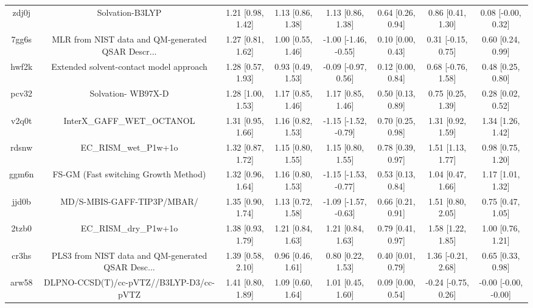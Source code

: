 \documentclass{article}
\begin{document}
\begin{center}
\begin{longtable}{|cccccccc|}
 zdj0j &                                    Solvation-B3LYP &  1.21 [0.98, 1.42] &  1.13 [0.86, 1.38] &     1.13 [0.86, 1.38] &  0.64 [0.26, 0.94] &    0.86 [0.41, 1.30] &    0.08 [-0.00, 0.32] \\
 7gg6s &  MLR from NIST data and QM-generated QSAR Descr... &  1.27 [0.81, 1.62] &  1.00 [0.55, 1.46] &  -1.00 [-1.46, -0.55] &  0.10 [0.00, 0.43] &   0.31 [-0.15, 0.75] &     0.60 [0.24, 0.99] \\
 hwf2k &            Extended solvent-contact model approach &  1.28 [0.57, 1.93] &  0.93 [0.49, 1.53] &   -0.09 [-0.97, 0.56] &  0.12 [0.00, 0.84] &   0.68 [-0.76, 1.58] &     0.48 [0.25, 0.80] \\
 pcv32 &                                 Solvation- WB97X-D &  1.28 [1.00, 1.53] &  1.17 [0.85, 1.46] &     1.17 [0.85, 1.46] &  0.50 [0.13, 0.89] &    0.75 [0.25, 1.39] &     0.28 [0.02, 0.52] \\
 v2q0t &                         InterX\_GAFF\_WET\_OCTANOL &  1.31 [0.95, 1.66] &  1.16 [0.82, 1.53] &  -1.15 [-1.52, -0.79] &  0.70 [0.25, 0.98] &    1.31 [0.92, 1.59] &     1.34 [1.26, 1.42] \\
 rdsnw &                              EC\_RISM\_wet\_P1w+1o &  1.32 [0.87, 1.72] &  1.15 [0.80, 1.55] &     1.15 [0.80, 1.55] &  0.78 [0.39, 0.97] &    1.51 [1.13, 1.77] &     0.98 [0.75, 1.20] \\
 ggm6n &               FS-GM (Fast switching Growth Method) &  1.32 [0.96, 1.64] &  1.16 [0.80, 1.53] &  -1.15 [-1.53, -0.77] &  0.53 [0.13, 0.84] &    1.04 [0.47, 1.66] &     1.17 [1.01, 1.32] \\
 jjd0b &                         MD/S-MBIS-GAFF-TIP3P/MBAR/ &  1.35 [0.90, 1.74] &  1.13 [0.72, 1.58] &  -1.09 [-1.57, -0.63] &  0.66 [0.21, 0.91] &    1.51 [0.80, 2.05] &     0.75 [0.47, 1.05] \\
 2tzb0 &                              EC\_RISM\_dry\_P1w+1o &  1.38 [0.93, 1.79] &  1.21 [0.84, 1.63] &     1.21 [0.84, 1.63] &  0.79 [0.41, 0.97] &    1.58 [1.22, 1.85] &     1.00 [0.76, 1.21] \\
 cr3hs &  PLS3 from NIST data and QM-generated QSAR Desc... &  1.39 [0.58, 2.10] &  0.96 [0.46, 1.61] &     0.80 [0.22, 1.53] &  0.40 [0.01, 0.79] &   1.36 [-0.21, 2.68] &     0.65 [0.33, 0.98] \\
 arw58 &            DLPNO-CCSD(T)/cc-pVTZ//B3LYP-D3/cc-pVTZ &  1.41 [0.80, 1.89] &  1.09 [0.60, 1.64] &     1.01 [0.45, 1.60] &  0.09 [0.00, 0.54] &  -0.24 [-0.75, 0.26] &  -0.00 [-0.00, -0.00] \\

\end{longtable}
\end{center}
\end{document}
